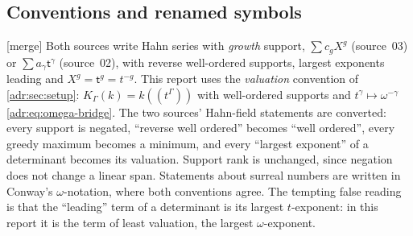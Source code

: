 \documentclass[11pt,letterpaper]{article}
\numberwithin{equation}{section}
\theoremstyle{definition}
\theoremstyle{remark}
\newcommand{\K}{K_\Gamma(k)}
\newcommand{\mtag}{\textup{[merge]}}%
\begin{document}
\subsection{Conventions and renamed symbols}
\label{adr:sr:sec:conventions}

\mtag{} Both sources write Hahn series with \emph{growth} support,
$\sum c_g X^g$ (source~03) or $\sum a_\gamma\mathsf t^\gamma$ (source~02),
with reverse well-ordered supports, largest exponents leading and
$X^g=\mathsf t^g=t^{-g}$. This report uses the \emph{valuation} convention
of \cref{adr:sec:setup}: $\K=k((t^\Gamma))$ with well-ordered supports and
$t^\gamma\mapsto\omega^{-\gamma}$ \eqref{adr:eq:omega-bridge}. The two sources'
Hahn-field statements are converted: every support is negated, ``reverse
well ordered'' becomes ``well ordered'', every greedy maximum becomes a
minimum, and every ``largest exponent'' of a determinant becomes its
valuation. Support rank is unchanged, since negation does not change a
linear span. Statements about surreal numbers are written in Conway's
$\omega$-notation, where both conventions agree. The tempting false reading
is that the ``leading'' term of a determinant is its largest $t$-exponent: in
this report it is the term of least valuation, the largest $\omega$-exponent.
\end{document}
